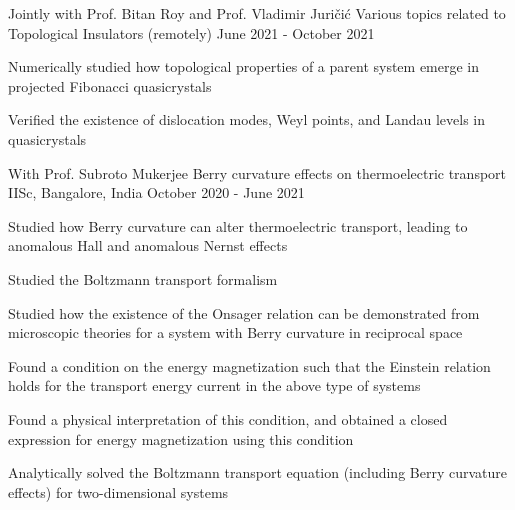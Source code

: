 

\begin{cventries}

\cventry
{Jointly with Prof. Bitan Roy and Prof. Vladimir Juri\v{c}i\'c} %
{Various topics related to Topological Insulators} %
{(remotely)} %
{June 2021 - October 2021} %
{
	\begin{cvitems} %
		\item {Numerically studied how topological properties of a parent system emerge in projected Fibonacci quasicrystals}
		\item {Verified the existence of dislocation modes, Weyl points, and Landau levels in quasicrystals}
	\end{cvitems}
}

\cventry
{With Prof. Subroto Mukerjee} %
{Berry curvature effects on thermoelectric transport} %
{IISc, Bangalore, India} %
{October 2020 - June 2021} %
{
	\begin{cvitems} %
		\item {Studied how Berry curvature can alter thermoelectric transport, leading to anomalous Hall and anomalous Nernst effects}
		\item {Studied the Boltzmann transport formalism}
		\item {Studied how the existence of the Onsager relation can be demonstrated from microscopic theories for a system with Berry curvature in reciprocal space}
		\item {Found a condition on the energy magnetization such that the Einstein relation holds for the transport energy current in the above type of systems}
		\item {Found a physical interpretation of this condition, and obtained a closed expression for energy magnetization using this condition}
		\item {Analytically solved the Boltzmann transport equation (including Berry curvature effects) for two-dimensional systems}
	\end{cvitems}
}
	

\end{cventries}

